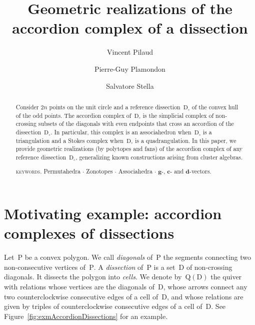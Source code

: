 \documentclass{amsart}
\title[Geometric realizations of the accordion complex of a dissection]{Geometric realizations of the \\ accordion complex of a dissection}
\author{Vincent Pilaud}
\author{Pierre-Guy Plamondon}
\author{Salvatore Stella}
\theoremstyle{definition}
\renewcommand{\b}[1]{\mathbf{#1}} %
\newcommand{\fref}[1]{Figure~\ref{#1}} %
\newcommand{\darkblue}{\color{darkblue}} %
\newcommand{\defn}[1]{\textsl{\darkblue #1}} %
\newcommand{\polygon}{\mathrm{P}} %
\newcommand{\dissection}{\mathrm{D}} %
\newcommand{\quiver}{\mathrm{Q}} %
\begin{document}
\begin{abstract}
Consider $2n$ points on the unit circle and a reference dissection~$\dissection_\circ$ of the convex hull of the odd points. The accordion complex of~$\dissection_\circ$ is the simplicial complex of non-crossing subsets of the diagonals with even endpoints that cross an accordion of the dissection~$\dissection_\circ$. In particular, this complex is an associahedron when~$\dissection_\circ$ is a triangulation and a Stokes complex when~$\dissection_\circ$ is a quadrangulation. In this paper, we provide geometric realizations (by polytopes and fans) of the accordion complex of any reference dissection~$\dissection_\circ$, generalizing known constructions arising from cluster algebras.

\medskip
\noindent
\textsc{keywords.} Permutahedra $\cdot$ Zonotopes $\cdot$ Associahedra $\cdot$ $\b{g}$-, $\b{c}$- and $\b{d}$-vectors.
\end{abstract}

\vspace*{-1cm}



\section{Motivating example: accordion complexes of dissections}

Let~$\polygon$ be a convex polygon.
We call \defn{diagonals} of~$\polygon$ the segments connecting two non-consecutive vertices of~$\polygon$.
A \defn{dissection} of~$\polygon$ is a set~$\dissection$ of non-crossing diagonals.
It dissects the polygon into \defn{cells}.
We denote by~$\quiver(\dissection)$ the quiver with relations whose vertices are the diagonals of~$\dissection$, whose arrows connect any two counterclockwise consecutive edges of a cell of~$\dissection$, and whose relations are given by triples of counterclockwise consecutive edges of a cell of~$\dissection$.
See \fref{fig:exmAccordionDissections} for an example.
\end{document}
